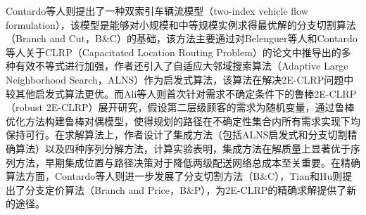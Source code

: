 \documentclass[fontset=none]{ctexart}
\begin{document}
Contardo等人则提出了一种双索引车辆流模型（two-index vehicle flow formulation）\cite{contardoLowerUpperBounds2012}，该模型是能够对小规模和中等规模实例求得最优解的分支切割算法（Branch and Cut，B\&C）的基础，该方法主要通过对Belenguer等人\cite{belenguerBranchandCutMethodCapacitated2011}和Contardo等人\cite{contardoComputationalComparisonFlow2013}关于CLRP（Capacitated Location Routing Problem）的论文中推导出的多种有效不等式进行加强，作者还引入了自适应大邻域搜索算法（Adaptive Large Neighborhood Search，ALNS）作为启发式算法，该算法在解决2E-CLRP问题中较其他启发式算法更优。而Ali等人则首次针对需求不确定条件下的鲁棒2E-CLRP（robust 2E-CLRP）展开研究\cite{aliIntegratedSequentialAlgorithms2025}，假设第二层级顾客的需求为随机变量，通过鲁棒优化方法构建鲁棒对偶模型，使得规划的路径在不确定性集合内所有需求实现下均保持可行。在求解算法上，作者设计了集成方法（包括ALNS启发式和分支切割精确算法）以及四种序列分解方法，计算实验表明，集成方法在解质量上显著优于序列方法，早期集成位置与路径决策对于降低两级配送网络总成本至关重要。在精确算法方面，Contardo等人则进一步发展了分支切割方法（B\&C）\cite{contardoExactAlgorithmBased2014}，Tian和Hu则提出了分支定价算法（Branch and Price，B\&P）\cite{tianBranchandpriceMethodTwoechelon2023}，为2E-CLRP的精确求解提供了新的途径。
\end{document}
